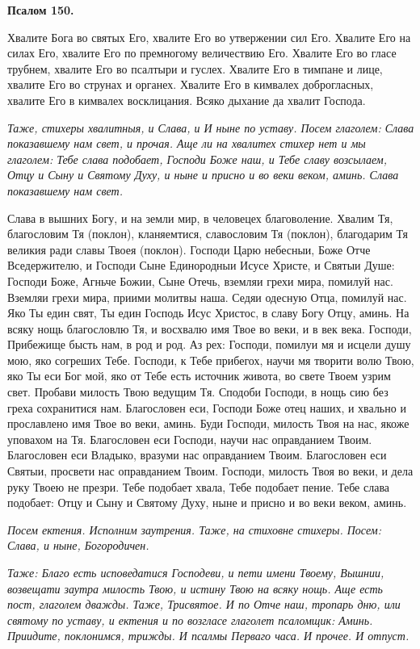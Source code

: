 \medskip


\bfseries Псалом 150.\normalfont{}


Хвалите Бога во святых Его, хвалите Его во утвержении сил Его. Хвалите Его на силах Его, хвалите Его по премногому величествию Его. Хвалите Его во гласе трубнем, хвалите Его во псалтыри и гуслех. Хвалите Его в тимпане и лице, хвалите Его во струнах и органех. Хвалите Его в кимвалех доброгласных, хвалите Его в кимвалех восклицания. Всяко дыхание да хвалит Господа.


\itshape Таже, стихеры хвалитныя, и Слава, и И ныне по уставу. Посем глаголем:\normalfont{} Слава показавшему нам свет, и прочая. Аще ли на хвалитех стихер нет и мы глаголем: Тебе слава подобает, Господи Боже наш, и Тебе славу возсылаем, Отцу и Сыну и Святому Духу, и ныне и присно и во веки веком, аминь. Слава показавшему нам свет. 

Слава в вышних Богу, и на земли мир, в человецех благоволение. Хвалим Тя, благословим Тя (поклон), кланяемтися, славословим Тя (поклон), благодарим Тя великия ради славы Твоея (поклон). Господи Царю небесныи, Боже Отче Вседержителю, и Господи Сыне Единородныи Исусе Христе, и Святыи Душе: Господи Боже, Агньче Божии, Сыне Отечь, вземляи грехи мира, помилуй нас. Вземляи грехи мира, приими молитвы наша. Седяи одесную Отца, помилуй нас. Яко Ты един свят, Ты един Господь Исус Христос, в славу Богу Отцу, аминь. На всяку нощь благословлю Тя, и восхвалю имя Твое во веки, и в век века. Господи, Прибежище бысть нам, в род и род. Аз рех: Господи, помилуи мя и исцели душу мою, яко согреших Тебе. Господи, к Тебе прибегох, научи мя творити волю Твою, яко Ты еси Бог мой, яко от Тебе есть источник живота, во свете Твоем узрим свет. Пробави милость Твою ведущим Тя. Сподоби Господи, в нощь сию без греха сохранитися нам. Благословен еси, Господи Боже отец наших, и хвально и прославлено имя Твое во веки, аминь. Буди Господи, милость Твоя на нас, якоже уповахом на Тя. Благословен еси Господи, научи нас оправданием Твоим. Благословен еси Владыко, вразуми нас оправданием Твоим. Благословен еси Святыи, просвети нас оправданием Твоим. Господи, милость Твоя во веки, и дела руку Твоею не презри. Тебе подобает хвала, Тебе подобает пение. Тебе слава подобает: Отцу и Сыну и Святому Духу, ныне и присно и во веки веком, аминь.


\itshape Посем ектения.\normalfont{} Исполним заутрения. Таже, на стиховне стихеры. Посем: Слава, и ныне, Богородичен.


\itshape Таже:\normalfont{} Благо есть исповедатися Господеви, и пети имени Твоему, Вышнии, возвещати заутра милость Твою, и истину Твою на всяку нощь. Аще есть пост, глаголем дважды. Таже, Трисвятое. И по Отче наш, тропарь дню, или святому по уставу, и ектения и по возгласе глаголет псаломщик: Аминь. Приидите, поклонимся, трижды. И псалмы Перваго часа. И прочее. И отпуст.


